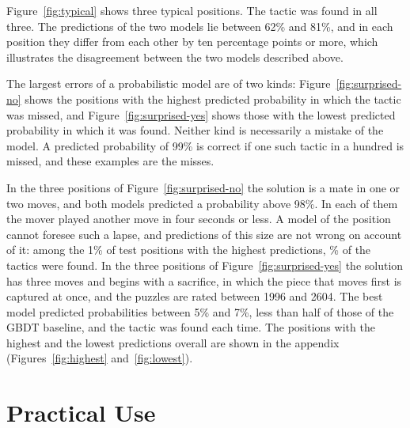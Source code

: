\documentclass[11pt]{article}
\begin{document}
Figure~\ref{fig:typical} shows three typical positions. The tactic was found
in all three. The predictions of the two models lie between 62\% and 81\%,
and in each position they differ from each other by ten percentage points or
more, which illustrates the disagreement between the two models described
above.

The largest errors of a probabilistic model are of two kinds:
Figure~\ref{fig:surprised-no} shows the positions with the highest predicted
probability in which the tactic was missed, and
Figure~\ref{fig:surprised-yes} shows those with the lowest predicted
probability in which it was found. Neither kind is necessarily a mistake of
the model. A predicted probability of 99\% is correct if one such tactic in a
hundred is missed, and these examples are the misses.

In the three positions of Figure~\ref{fig:surprised-no} the solution is a
mate in one or two moves, and both models predicted a probability above
98\%. In each of them the mover played another move in four seconds or less.
A model of the position cannot foresee such a lapse, and predictions of this
size are not wrong on account of it: among the 1\% of test positions with the
highest predictions, \% of the tactics were found. In the
three positions of Figure~\ref{fig:surprised-yes} the solution has three
moves and begins with a sacrifice, in which the piece that moves first is
captured at once, and the puzzles are rated between 1996 and 2604. The best
model predicted probabilities between 5\% and 7\%, less than half of those
of the GBDT baseline, and the tactic was found each time. The positions with
the highest and the lowest predictions overall are shown in the appendix
(Figures~\ref{fig:highest} and~\ref{fig:lowest}).



\fi

\section{Practical Use}
\label{sec:use}
\end{document}
